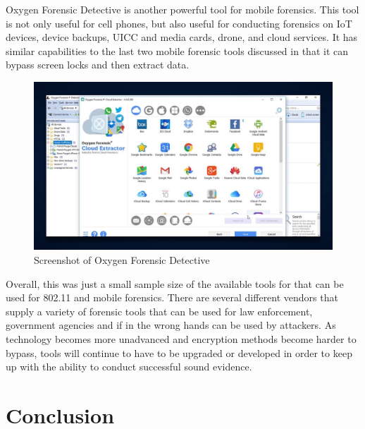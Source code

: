 \documentclass[acmlarge]{style/acmart}
\begin{document}
Oxygen Forensic Detective is another powerful tool for mobile forensics. This tool is not only useful for cell phones, but also useful for conducting forensics on IoT devices, device backups, UICC and media cards, drone, and cloud services. It has similar capabilities to the last two mobile forensic tools discussed in that it can bypass screen locks and then extract data. 

\begin{figure}[H]
  \centering
  \includegraphics[width=0.5\linewidth]{imgs/oxygen.jpg}
  \caption{Screenshot of Oxygen Forensic Detective}
  \label{fig:oxygen}
\end{figure}
 
Overall, this was just a small sample size of the available tools for that can be used for 802.11 and mobile forensics. There are several different vendors that supply a variety of forensic tools that can be used for law enforcement, government agencies and if in the wrong hands can be used by attackers. As technology becomes more unadvanced and encryption methods become harder to bypass, tools will continue to have to be upgraded or developed in order to keep up with the ability to conduct successful sound evidence.

\section{Conclusion}



\end{document}

